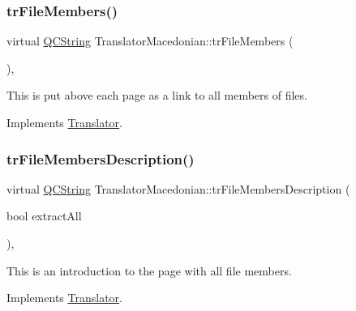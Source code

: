 \mbox{\label{class_translator_macedonian_a572cc28b6c4cb8359e6971f2f3877f46}} 
\subsubsection{\texorpdfstring{trFileMembers()}{trFileMembers()}}
{\footnotesize\ttfamily virtual \mbox{\hyperlink{class_q_c_string}{Q\+C\+String}} Translator\+Macedonian\+::tr\+File\+Members (\begin{DoxyParamCaption}{ }\end{DoxyParamCaption})\hspace{0.3cm}{\ttfamily [inline]}, {\ttfamily [virtual]}}

This is put above each page as a link to all members of files. 

Implements \mbox{\hyperlink{class_translator}{Translator}}.

\mbox{\label{class_translator_macedonian_a7254eb307ccff8ea9be6dd5f8367a846}} 
\subsubsection{\texorpdfstring{trFileMembersDescription()}{trFileMembersDescription()}}
{\footnotesize\ttfamily virtual \mbox{\hyperlink{class_q_c_string}{Q\+C\+String}} Translator\+Macedonian\+::tr\+File\+Members\+Description (\begin{DoxyParamCaption}\item[{bool}]{extract\+All }\end{DoxyParamCaption})\hspace{0.3cm}{\ttfamily [inline]}, {\ttfamily [virtual]}}

This is an introduction to the page with all file members. 

Implements \mbox{\hyperlink{class_translator}{Translator}}.

\mbox{\label{class_translator_macedonian_adb73d2a41e4fd4b0b083d66f9a9ac2b4}} 
